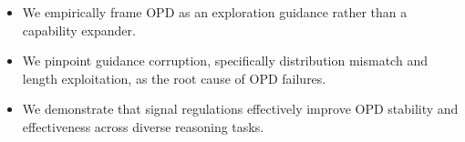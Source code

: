 \documentclass[11pt]{article}
\begin{document}
\begin{itemize}[leftmargin=*,nosep]
    \item We empirically frame OPD as an exploration guidance rather than a capability expander.
    \item We pinpoint guidance corruption, specifically distribution mismatch and length exploitation, as the root cause of OPD failures.
    \item We demonstrate that signal regulations effectively improve OPD stability and effectiveness across diverse reasoning tasks.
\end{itemize}
\end{document}
